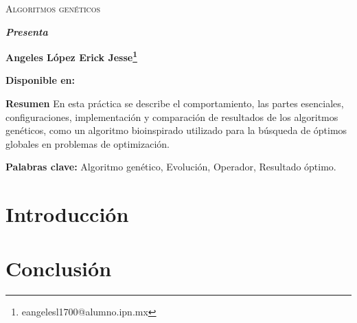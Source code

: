 \documentclass[12pt,twoside]{report}
\newcommand{\keywords}[1]{%
	\begin{center}
		\textbf{Palabras clave:} #1
	\end{center}
}
\begin{document}
	\centerline{}
	
	
	
	\begin{center}
		\Large{\textsc{Algoritmos genéticos}} 
	\end{center}
	\centerline{}
	\centerline{\bf {\textit{Presenta}}}
	\centerline{}
	\centerline{\bf {Angeles López Erick Jesse\footnote{eangelesl1700@alumno.ipn.mx}}}
	\centerline{}
	\centerline{}
	\centerline{\bf {Disponible en:}}
	\centerline{}
	

	\bigskip
	
	\bigskip

	\textbf{Resumen} 
		En esta práctica se describe el comportamiento, las partes esenciales, configuraciones, implementación y comparación de resultados de los algoritmos genéticos, como un algoritmo bioinspirado utilizado para la búsqueda de óptimos globales en problemas de optimización.
	\bigskip
	
	\bigskip
	
	\keywords{Algoritmo genético, Evolución, Operador, Resultado óptimo. }
	
	\clearpage
	
	\tableofcontents
	\clearpage
	
	\chapter*{Introducción}
	
	
	
	
	
	
	
	
	
	
	\chapter*{Conclusión}
	
	\clearpage
	
	
	
\end{document}
